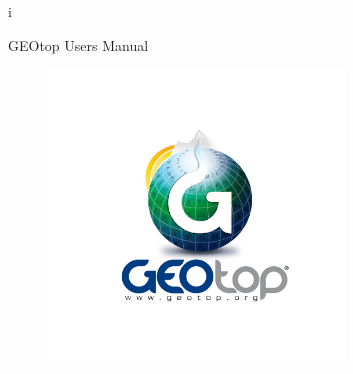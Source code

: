 i\thispagestyle{empty}
 
 GEOtop Users Manual
 
 
 \begin{figure}[!htbp]
\begin{center}
  \includegraphics[width=0.7\textwidth]{images/titlepage/Geotop_R.pdf}
\end{center}
%
 \end{figure}